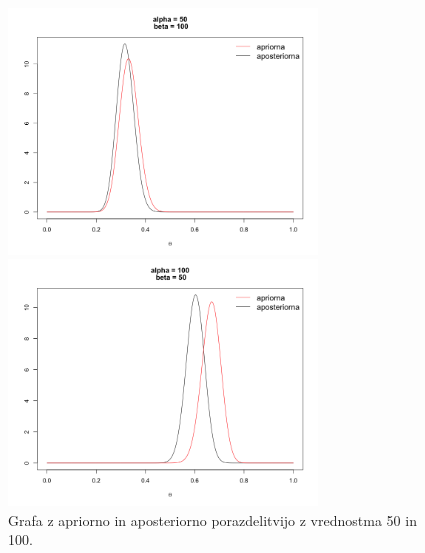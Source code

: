 \documentclass[a4paper,11pt]{article}
\begin{document}
\begin{figure}[ht!]
    \begin{minipage}{0.5\textwidth}
        \centering
        \includegraphics[width=82mm]{Slike/1_8.png}
    \end{minipage}\hfill
    \begin{minipage}{0.5\textwidth}
        \centering
        \includegraphics[width=82mm]{Slike/1_9.png}
    \end{minipage}\hfill
    \caption{Grafa z apriorno in aposteriorno porazdelitvijo z vrednostma 50 in 100.}
\end{figure}
\end{document}
